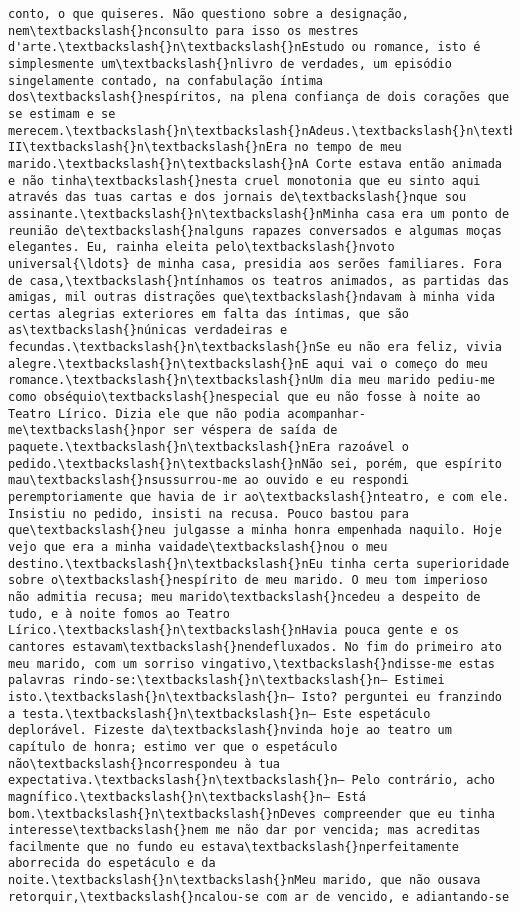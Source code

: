 \documentclass[11pt]{article}
\begin{document}
\begin{Verbatim}[commandchars=\\\{\}]
conto, o que quiseres. Não questiono sobre a designação, nem\textbackslash{}nconsulto para isso os mestres d'arte.\textbackslash{}n\textbackslash{}nEstudo ou romance, isto é simplesmente um\textbackslash{}nlivro de verdades, um episódio singelamente contado, na confabulação íntima dos\textbackslash{}nespíritos, na plena confiança de dois corações que se estimam e se merecem.\textbackslash{}n\textbackslash{}nAdeus.\textbackslash{}n\textbackslash{}nCAPÍTULO II\textbackslash{}n\textbackslash{}nEra no tempo de meu marido.\textbackslash{}n\textbackslash{}nA Corte estava então animada e não tinha\textbackslash{}nesta cruel monotonia que eu sinto aqui através das tuas cartas e dos jornais de\textbackslash{}nque sou assinante.\textbackslash{}n\textbackslash{}nMinha casa era um ponto de reunião de\textbackslash{}nalguns rapazes conversados e algumas moças elegantes. Eu, rainha eleita pelo\textbackslash{}nvoto universal{\ldots} de minha casa, presidia aos serões familiares. Fora de casa,\textbackslash{}ntínhamos os teatros animados, as partidas das amigas, mil outras distrações que\textbackslash{}ndavam à minha vida certas alegrias exteriores em falta das íntimas, que são as\textbackslash{}núnicas verdadeiras e fecundas.\textbackslash{}n\textbackslash{}nSe eu não era feliz, vivia alegre.\textbackslash{}n\textbackslash{}nE aqui vai o começo do meu romance.\textbackslash{}n\textbackslash{}nUm dia meu marido pediu-me como obséquio\textbackslash{}nespecial que eu não fosse à noite ao Teatro Lírico. Dizia ele que não podia acompanhar-me\textbackslash{}npor ser véspera de saída de paquete.\textbackslash{}n\textbackslash{}nEra razoável o pedido.\textbackslash{}n\textbackslash{}nNão sei, porém, que espírito mau\textbackslash{}nsussurrou-me ao ouvido e eu respondi peremptoriamente que havia de ir ao\textbackslash{}nteatro, e com ele. Insistiu no pedido, insisti na recusa. Pouco bastou para que\textbackslash{}neu julgasse a minha honra empenhada naquilo. Hoje vejo que era a minha vaidade\textbackslash{}nou o meu destino.\textbackslash{}n\textbackslash{}nEu tinha certa superioridade sobre o\textbackslash{}nespírito de meu marido. O meu tom imperioso não admitia recusa; meu marido\textbackslash{}ncedeu a despeito de tudo, e à noite fomos ao Teatro Lírico.\textbackslash{}n\textbackslash{}nHavia pouca gente e os cantores estavam\textbackslash{}nendefluxados. No fim do primeiro ato meu marido, com um sorriso vingativo,\textbackslash{}ndisse-me estas palavras rindo-se:\textbackslash{}n\textbackslash{}n— Estimei isto.\textbackslash{}n\textbackslash{}n— Isto? perguntei eu franzindo a testa.\textbackslash{}n\textbackslash{}n— Este espetáculo deplorável. Fizeste da\textbackslash{}nvinda hoje ao teatro um capítulo de honra; estimo ver que o espetáculo não\textbackslash{}ncorrespondeu à tua expectativa.\textbackslash{}n\textbackslash{}n— Pelo contrário, acho magnífico.\textbackslash{}n\textbackslash{}n— Está bom.\textbackslash{}n\textbackslash{}nDeves compreender que eu tinha interesse\textbackslash{}nem me não dar por vencida; mas acreditas facilmente que no fundo eu estava\textbackslash{}nperfeitamente aborrecida do espetáculo e da noite.\textbackslash{}n\textbackslash{}nMeu marido, que não ousava retorquir,\textbackslash{}ncalou-se com ar de vencido, e adiantando-se 
\end{Verbatim}
\end{document}

